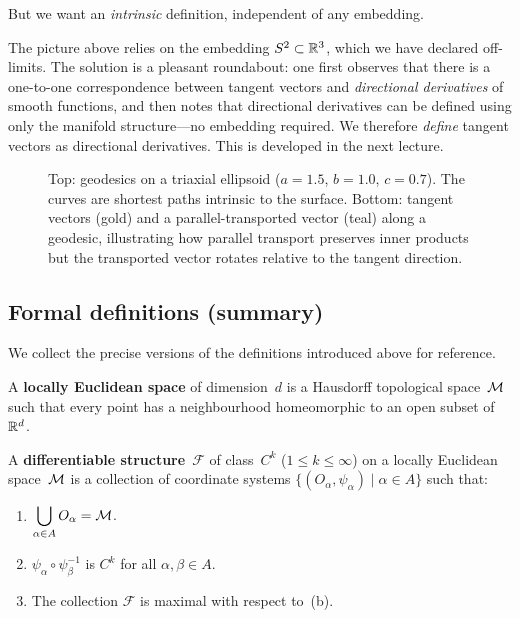 But we want an \emph{intrinsic} definition, independent of any
embedding.

\begin{keyresult}
  The picture above relies on the embedding $S^2\subset\mathbb{R}^{3}$,
  which we have declared off-limits.  The solution is a pleasant
  roundabout: one first observes that there is a one-to-one
  correspondence between tangent vectors and \emph{directional
  derivatives} of smooth functions, and then notes that directional
  derivatives can be defined using only the manifold
  structure---no embedding required.  We therefore \emph{define}
  tangent vectors as directional derivatives.
  This is developed in the next lecture.
\end{keyresult}

\begin{figure}[htbp]
  \centering
  
  \caption{Top: geodesics on a triaxial ellipsoid
    ($a=1.5$, $b=1.0$, $c=0.7$).  The curves are shortest paths
    intrinsic to the surface.
    Bottom: tangent vectors (gold) and a parallel-transported
    vector (teal) along a geodesic, illustrating how
    parallel transport preserves inner products but the
    transported vector rotates relative to the tangent
    direction.}\label{fig:ellipsoid-geodesics}
\end{figure}

\subsection{Formal definitions (summary)}

We collect the precise versions of the definitions introduced
above for reference.

\begin{definition}\label{def:loc-eucl}
  A \textbf{locally Euclidean space} of dimension~$d$ is a
  Hausdorff topological space~$\mathcal{M}$ such that every point has a
  neighbourhood homeomorphic to an open subset of~$\mathbb{R}^{d}$.
\end{definition}

\begin{definition}\label{def:diff-struct}
  A \textbf{differentiable structure}~$\mathcal{F}$ of class~$C^k$
  ($1\le k\le\infty$) on a locally Euclidean space~$\mathcal{M}$ is a
  collection of coordinate systems
  $\{(O_\alpha,\psi_\alpha)\mid\alpha\in A\}$ such that:
  \begin{enumerate}
    \item[\textup{(a)}] $\displaystyle\bigcup_{\alpha\in A}
      O_\alpha = \mathcal{M}$.
    \item[\textup{(b)}] $\psi_\alpha\circ\psi_\beta^{-1}$ is
      $C^k$ for all $\alpha,\beta\in A$.
    \item[\textup{(c)}] The collection $\mathcal{F}$ is maximal
      with respect to~(b).
  \end{enumerate}
\end{definition}

